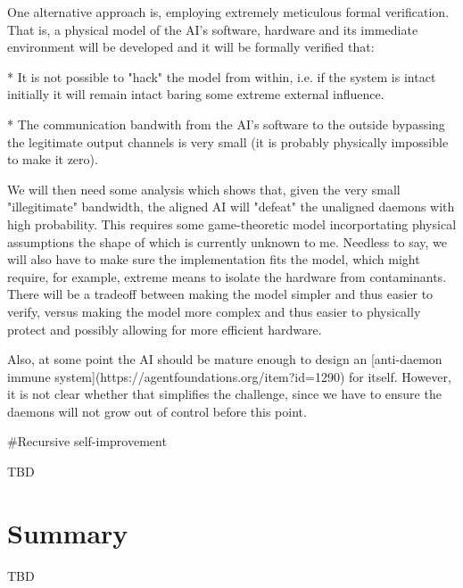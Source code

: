 \documentclass[a4paper]{article}
\begin{document}
One alternative approach is, employing extremely meticulous formal verification. That is, a physical model of the AI's software, hardware and its immediate environment will be developed and it will be formally verified that:

* It is not possible to "hack" the model from within, i.e. if the system is intact initially it will remain intact baring some extreme external influence.

* The communication bandwith from the AI's software to the outside bypassing the legitimate output channels is very small (it is probably physically impossible to make it zero).

We will then need some analysis which shows that, given the very small "illegitimate" bandwidth, the aligned AI will "defeat" the unaligned daemons with high probability. This requires some game-theoretic model incorportating physical assumptions the shape of which is currently unknown to me. Needless to say, we will also have to make sure the implementation fits the model, which might require, for example, extreme means to isolate the hardware from contaminants. There will be a tradeoff between making the model simpler and thus easier to verify, versus making the model more complex and thus easier to physically protect and possibly allowing for more efficient hardware.

Also, at some point the AI should be mature enough to design an [anti-daemon immune system](https://agentfoundations.org/item?id=1290) for itself. However, it is not clear whether that simplifies the challenge, since we have to ensure the daemons will not grow out of control before this point.

\#Recursive self-improvement

TBD

\section{Summary}


TBD
\end{document}
